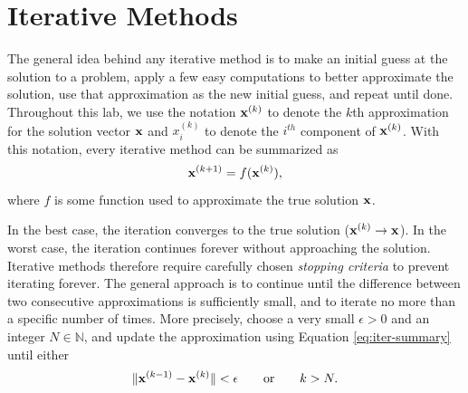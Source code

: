 \label{lab:iter_methods}




\section*{Iterative Methods} %

The general idea behind any iterative method is to make an initial guess at the solution to a problem, apply a few easy computations to better approximate the solution, use that approximation as the new initial guess, and repeat until done.
Throughout this lab, we use the notation $\mathbf{x}^{(k)}$ to denote the $k$th approximation for the solution vector $\mathbf{x}$ and $x^{(k)}_i$ to denote the $i^{th}$ component of $\mathbf{x}^{(k)}$.
With this notation, every iterative method can be summarized as
\begin{equation}\mathbf{x}^{(k+1)} = f(\mathbf{x}^{(k)}),\label{eq:iter-summary}\end{equation}
where $f$ is some function used to approximate the true solution $\mathbf{x}$.

In the best case, the iteration converges to the true solution ($\mathbf{x}^{(k)}\rightarrow\mathbf{x}$).
In the worst case, the iteration continues forever without approaching the solution.
Iterative methods therefore require carefully chosen \emph{stopping criteria} to prevent iterating forever.
The general approach is to continue until the difference between two consecutive approximations is sufficiently small, and to iterate no more than a specific number of times.
More precisely, choose a very small $\epsilon > 0$ and an integer $N\in\mathbb{N}$, and update the approximation using Equation \ref{eq:iter-summary} until either
\begin{equation} %
\|\x^{(k-1)}-\x^{(k)}\| < \epsilon
\qquad \text{or} \qquad
k > N.
\label{stopping-criteria}
\end{equation}

